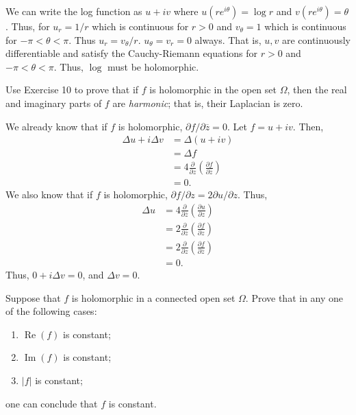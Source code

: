 \documentclass[12 pt, letterpaper]{hmcpset}
\begin{document}
\begin{solution}
	We can write the log function as $u + i v$ where $u(r e^{i \theta}) = \log r$ and $v(r e^{i \theta}) = \theta$. Thus, for $u_{r} = 1 / r$ which is continuous for $r > 0$ and $v_{\theta} = 1$ which is continuous for $-\pi < \theta < \pi$. Thus $u_{r} = v_{\theta} / r$. $u_{\theta} = v_{r} = 0$ always. That is, $u, v$ are continuously differentiable and satisfy the Cauchy-Riemann equations for $r > 0$ and $- \pi < \theta < \pi$. Thus, $\log$ must be holomorphic.
\end{solution}

\pagebreak

\begin{problem}[11]
	Use Exercise 10 to prove that if $f$ is holomorphic in the open set $\Omega$, then the real and imaginary parts of $f$ are \emph{harmonic}; that is, their Laplacian is zero.
\end{problem}

\begin{solution}
	We already know that if $f$ is holomorphic, ${\partial f}/{\partial \overline{z}} = 0$. Let $f = u + i v$. Then,
	\[
		\begin{split}
			\Delta u + i \Delta v & = \Delta(u + iv) \\
					      & = \Delta f \\
					      & = 4 \frac{\partial }{\partial z} \left ( \frac{\partial f}{\partial \overline{z}} \right ) \\
					      & = 0.
		\end{split}
	\]
	We also know that if $f$ is holomorphic, $\partial f / \partial z = 2 \partial u/ \partial z$. Thus,
	\[
		\begin{split}
			\Delta u & = 4 \frac{\partial }{\partial \overline{z}} \left ( \frac{\partial u}{\partial z} \right ) \\
				 & = 2 \frac{\partial }{\partial \overline{z}} \left ( \frac{\partial f}{\partial z} \right ) \\
				 & = 2 \frac{\partial }{\partial z} \left ( \frac{\partial f}{\partial \overline{z}} \right ) \\
				 & = 0.
		\end{split}
	\]
	Thus, $0 + i \Delta v = 0$, and $\Delta v = 0$.
\end{solution}

\pagebreak

\begin{problem}[13]
	Suppose that $f$ is holomorphic in a connected open set $\Omega$. Prove that in any one of the following cases:
	\begin{enumerate}
		\item $\operatorname{Re}(f)$ is constant;
		\item $\operatorname{Im}(f)$ is constant;
		\item $\lvert f \rvert$ is constant;
	\end{enumerate}
	one can conclude that $f$ is constant.
\end{problem}
\end{document}
